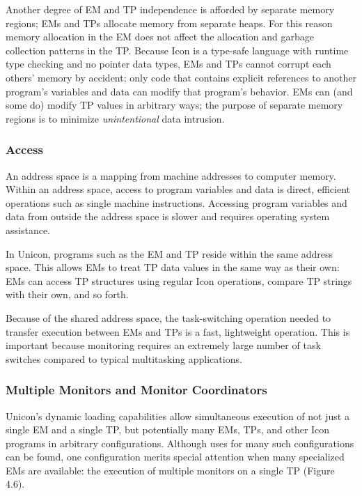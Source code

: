 Another degree of EM and TP independence is afforded by separate
memory regions; EMs and TPs allocate memory from separate heaps.
For this reason memory allocation in the EM does not affect the allocation
and garbage collection patterns in the TP.  Because Icon is a type-safe
language with runtime type checking and no pointer data types, EMs
and TPs cannot corrupt each others' memory by accident; only code that
contains explicit references to another program's variables and data
can modify that program's behavior.
EMs can (and some do) modify TP values in arbitrary ways; the purpose
of separate memory regions is to minimize {\em unintentional\/} data
intrusion.


\subsubsection{Access}

An address space is a mapping from machine addresses to computer memory.
Within an address space, access to program variables and data is direct,
efficient operations such as single machine instructions.  Accessing
program variables and data from outside the address space is slower and
requires operating system assistance.

In Unicon, programs such as the EM and TP reside within the same address
space.  This allows EMs to treat TP data values in the same way as
their own: EMs can access TP structures using regular Icon operations,
compare TP strings with their own, and so forth.

Because of the shared address space, the task-switching operation
needed to transfer execution between EMs and TPs is a fast,
lightweight operation.  This is important because monitoring
requires an extremely large number of task switches compared to
typical multitasking applications.


\subsubsection{Multiple Monitors and Monitor Coordinators}

Unicon's dynamic loading capabilities allow simultaneous execution of
not just a single EM and a single TP, but potentially many EMs, TPs,
and other Icon programs in arbitrary configurations.  Although uses
for many such configurations can be found, one configuration merits
special attention when many specialized EMs are available: the
execution of multiple monitors on a single TP  (Figure 4.6).


